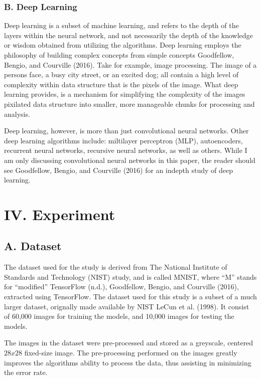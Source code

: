 \documentclass[conference,final,]{IEEEtran}
\begin{document}
\subsubsection{B. Deep Learning}\label{b.-deep-learning}

Deep learning is a subset of machine learning, and refers to the depth
of the layers within the neural network, and not necessarily the depth
of the knowledge or wisdom obtained from utilizing the algorithms. Deep
learning employs the philosophy of building complex concepts from simple
concepts Goodfellow, Bengio, and Courville (2016). Take for example,
image processing. The image of a persons face, a busy city street, or an
excited dog; all contain a high level of complexity within data
structure that is the pixels of the image. What deep learning provides,
is a mechanism for simplifying the complexity of the images pixilated
data structure into smaller, more manageable chunks for processing and
analysis.

Deep learning, however, is more than just convolutional neural networks.
Other deep learning algorithms include: miltilayer perceptron (MLP),
autoencoders, recurrent neural networks, recursive neural networks, as
well as others. While I am only discussing convolutional neural networks
in this paper, the reader should see Goodfellow, Bengio, and Courville
(2016) for an indepth study of deep learning.

\section{IV. Experiment}\label{iv.-experiment}

\subsection{A. Dataset}\label{a.-dataset}

The dataset used for the study is derived from The National Institute of
Standards and Technology (NIST) study, and is called MNIST, where ``M''
stands for ``modified'' TensorFlow (n.d.), Goodfellow, Bengio, and
Courville (2016), extracted using TensorFlow. The dataset used for this
study is a subset of a much larger dataset, orignally made available by
NIST LeCun et al. (1998). It consist of 60,000 images for training the
models, and 10,000 images for testing the models.

The images in the dataset were pre-processed and stored as a greyscale,
centered \(28x28\) fixed-size image. The pre-processing performed on the
images greatly improves the algorithms ability to process the data, thus
assisting in minimizing the error rate.
\end{document}
